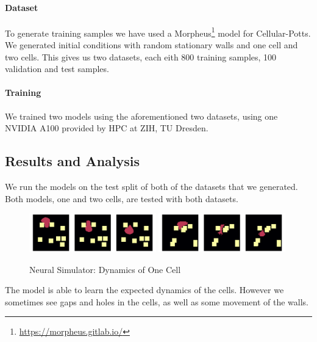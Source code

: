 \documentclass[a4paper,10pt,twocolumn]{article}
\begin{document}
        \paragraph{Dataset}
        To generate training samples we have used a Morpheus\footnote{\url{https://morpheus.gitlab.io/}}\cite{morpheus} 
        model for Cellular-Potts.
        We generated initial conditions with random stationary walls and one cell and two cells. 
        This gives us two datasets, each eith 800 training samples, 100 validation and test samples.
        
        \paragraph{Training}
        We trained two models using the aforementioned two datasets, using one NVIDIA A100 
        provided by HPC at ZIH, TU Dresden.

        \subsection{Results and Analysis}
            We run the models on the test split of both of the datasets that we generated.
            Both models, one and two cells, are tested with both datasets.

            \begin{figure}[H]\centering
                \includegraphics[width=0.49\textwidth]{../images/run_40.png}
                \includegraphics[width=0.49\textwidth]{../images/run_32.png}
                \caption{Neural Simulator: Dynamics of One Cell}
            \end{figure}
            The model is able to learn the expected dynamics of the cells.
            However we sometimes see gaps and holes
            in the cells, as well as some movement of the walls.
\end{document}
